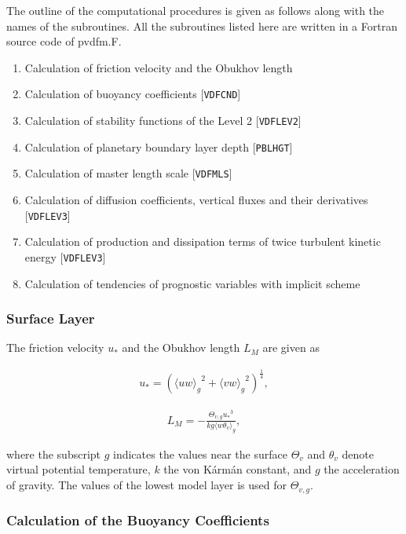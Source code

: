 The outline of the computational procedures is given as follows along with the names of the subroutines. All the subroutines listed here are written in a Fortran source code of pvdfm.F.

\begin{enumerate}
\def\labelenumi{\arabic{enumi}.}
\tightlist
\item
  Calculation of friction velocity and the Obukhov length
\item
  Calculation of buoyancy coefficients {[}\texttt{VDFCND}{]}
\item
  Calculation of stability functions of the Level 2 {[}\texttt{VDFLEV2}{]}
\item
  Calculation of planetary boundary layer depth {[}\texttt{PBLHGT}{]}
\item
  Calculation of master length scale {[}\texttt{VDFMLS}{]}
\item
  Calculation of diffusion coefficients, vertical fluxes and their derivatives {[}\texttt{VDFLEV3}{]}
\item
  Calculation of production and dissipation terms of twice turbulent kinetic energy {[}\texttt{VDFLEV3}{]}
\item
  Calculation of tendencies of prognostic variables with implicit scheme
\end{enumerate}

\hypertarget{surface-layer}{%
\subsubsection{Surface Layer}\label{surface-layer}}

The friction velocity \(u_*\) and the Obukhov length \(L_M\) are given as

\begin{eqnarray}u_*=\left({\langle uw \rangle_g}^2+{\langle vw \rangle_g}^2 \right)^\frac{1}{4},\end{eqnarray}

\begin{eqnarray}L_M=-\frac{\Theta_{v,g} {u_*}^3}{kg \langle w\theta_v \rangle_g},\end{eqnarray}

where the subscript \(g\) indicates the values near the surface \(\Theta_v\) and \(\theta_v\) denote virtual potential temperature, \(k\) the von Kármán constant, and \(g\) the acceleration of
gravity. The values of the lowest model layer is used for \(\Theta_{v,g}\).

\hypertarget{calculation-of-the-buoyancy-coefficients}{%
\subsubsection{Calculation of the Buoyancy Coefficients}\label{calculation-of-the-buoyancy-coefficients}}

